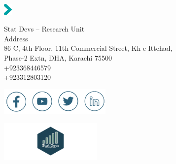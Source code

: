 \documentclass[
  ignorenonframetext,
]{beamer}
\begin{document}
\thispagestyle{empty}


\begin{center}

\color{statdevs}

\vspace*{10cm}

\includegraphics[height=0.6cm]{quarto-statdevs-template/images/fleche-titre.png}\par

\sffamily
Stat Devs -- Research Unit\\
Address\\
86-C, 4th Floor, 11th Commercial Street, Kh-e-Ittehad, \\
Phase-2 Extn, DHA, Karachi 75500 \\
+923368446579\\
+923312803120\par\bigskip

\includegraphics{quarto-statdevs-template/images/social-media.png}\par\bigskip

\vspace*{2cm}

\par\bigskip

\includegraphics[width=5cm]{quarto-statdevs-template/images/Final-Logo.png}\par

\end{center}

\restoregeometry
\end{document}
